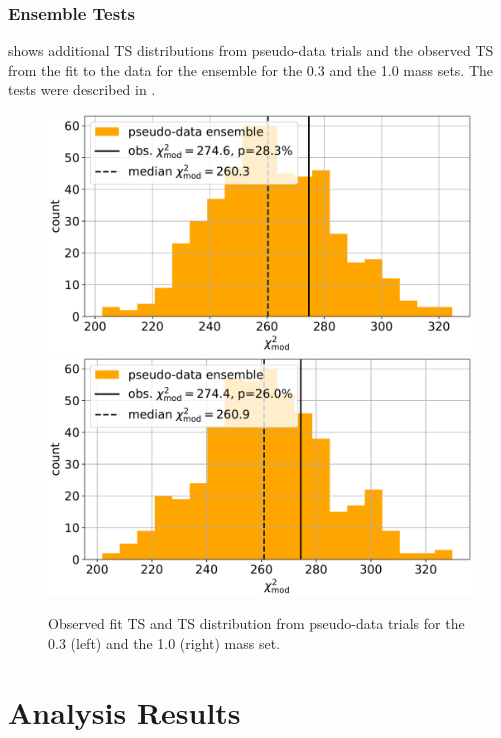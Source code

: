 

\subsection{Ensemble Tests} 

 shows additional TS distributions from pseudo-data trials and the observed TS from the fit to the data for the ensemble for the \SI{0.3}{\gev} and the \SI{1.0}{\gev} mass sets. The tests were described in .

\begin{figure}[h]
    \includegraphics[width=0.49\linewidth]{figures/results/blind_fits/full_blind_fit_0.3_GeV_gauss_plus_poisson_step_3_4-1.png}
    \includegraphics[width=0.49\linewidth]{figures/results/blind_fits/full_blind_fit_1.0_GeV_gauss_plus_poisson_step_3_4-1.png}
	\caption[Pseudo-data trials TS distribution (\SI{0.3}{\gev}, \SI{1.0}{\gev})]{Observed fit TS and TS distribution from pseudo-data trials for the \SI{0.3}{\gev} (left) and the \SI{1.0}{\gev} (right) mass set.}
\end{figure}


\chapter{Analysis Results}



